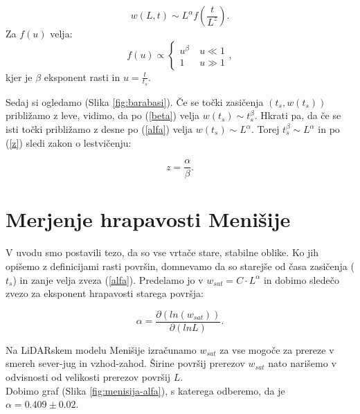 \documentclass[a4paper, twoside, 12pt]{book}
\begin{document}
  \begin{equation}
    w(L,t) \sim L^\alpha f(\frac{t}{L^z}).
    \label{family-vicsek}
  \end{equation}
Za $f(u)$ velja:
  \begin{equation}
    f(u) \propto \left \{ \begin{array}{lr} u^{\beta} & \ u\ll 1 \\
      1 & \ u\gg1\end{array}, \right.
    \end{equation}
kjer je $\beta$ eksponent rasti in $u=\frac{t}{t_s}$.

Sedaj si ogledamo (Slika \ref{fig:barabasi}). Če se točki zasičenja $(t_s,w(t_s))$ približamo z leve, vidimo, da po (\ref{beta}) velja $w(t_s) \sim t_s^\beta$. Hkrati pa, da če se isti točki približamo z desne po (\ref{alfa}) velja $w(t_s) \sim L^\alpha$. Torej $t_s^\beta \sim L^\alpha$ in po (\ref{z}) sledi zakon o lestvičenju:

    \begin{equation}
      z = \frac{\alpha}{\beta}.
    \end{equation}



    \section{Merjenje hrapavosti Menišije}
    \label{hrapavost}

V uvodu smo postavili tezo, da so vse vrtače stare, stabilne oblike. Ko jih opišemo z definicijami rasti površin, domnevamo da so starejše od časa zasičenja ($t_s$) in zanje velja zveza (\ref{alfa}). Predelamo jo v $ w_{sat}=C \cdot L^\alpha $ in dobimo sledečo zvezo za eksponent hrapavosti starega površja:

    \begin{equation}
      \alpha = \frac{\partial ( ln (w_{sat}) ) }{\partial ( ln L )}.
      \label{alpha-numeric}
    \end{equation}

    Na LiDARskem modelu Menišije izračunamo ${w}_{sat}$ za vse mogoče za prereze v smereh sever-jug in vzhod-zahod. Širine površij prerezov $w_{sat}$ nato narišemo v odvisnosti od velikosti prerezov površij $L$.\\
Dobimo graf (Slika \ref{fig:menisija-alfa}), s katerega odberemo, da je $\alpha =  0.409 \pm 0.02$.
\end{document}

